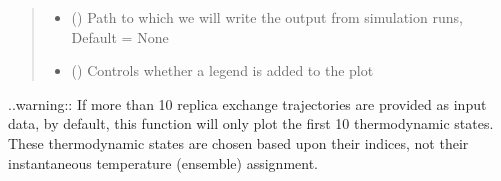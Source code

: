 \documentclass[letterpaper,12pt,english,openany,oneside]{sphinxmanual}
\begin{document}
\begin{fulllineitems}
\begin{quote}
\begin{description}
\begin{itemize}
\item {} 
 () \textendash{} Path to which we will write the output from simulation runs, Default = None

\item {} 
 () \textendash{} Controls whether a legend is added to the plot

\end{itemize}

\end{description}\end{quote}

..warning:: If more than 10 replica exchange trajectories are provided as input data, by default, this function will only plot the first 10 thermodynamic states.  These thermodynamic states are chosen based upon their indices, not their instantaneous temperature (ensemble) assignment.

\end{fulllineitems}

\end{document}
